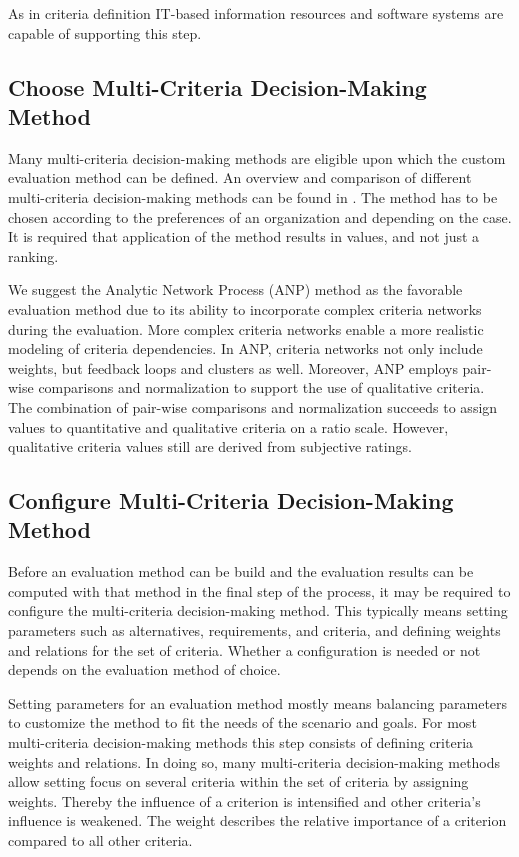 \documentclass[journal,final,a4paper,twoside]{IEEEtran}
\begin{document}
As in criteria definition IT-based information resources and software systems are capable of supporting this step.

\subsection{Choose Multi-Criteria Decision-Making Method}
Many multi-criteria decision-making methods are eligible upon which the custom evaluation method can be defined. An overview and comparison of different multi-criteria decision-making methods can be found in \cite{baker2001guidebook}\cite{yoon1995multiple}. The method has to be chosen according to the preferences of an organization and depending on the case. It is required that application of the method results in values, and not just a ranking. 

We suggest the Analytic Network Process (ANP) \cite{saatybook2005}\cite{saaty2004decision} method as the favorable evaluation method due to its ability to incorporate complex criteria networks during the evaluation. More complex criteria networks enable a more realistic modeling of criteria dependencies. In ANP, criteria networks not only include weights, but feedback loops and clusters as well. Moreover, ANP employs pair-wise comparisons and normalization to support the use of qualitative criteria. The combination of pair-wise comparisons and normalization succeeds to assign values to quantitative and qualitative criteria on a ratio scale. However, qualitative criteria values still are derived from subjective ratings.

\subsection{Configure Multi-Criteria Decision-Making Method}
\label{configureMCDM}
Before an evaluation method can be build and the evaluation results can be computed with that method in the final step of the process, it may be required to configure the multi-criteria decision-making method. This typically means setting parameters such as alternatives, requirements, and criteria, and defining weights and relations for the set of criteria. Whether a configuration is needed or not depends on the evaluation method of choice. 

Setting parameters for an evaluation method mostly means balancing parameters to customize the method to fit the needs of the scenario and goals. For most multi-criteria decision-making methods this step consists of defining criteria weights and relations. In doing so, many multi-criteria decision-making methods allow setting focus on several criteria within the set of criteria by assigning weights. Thereby the influence of a criterion is intensified and other criteria's influence is weakened. The weight describes the relative importance of a criterion compared to all other criteria.
\end{document}
